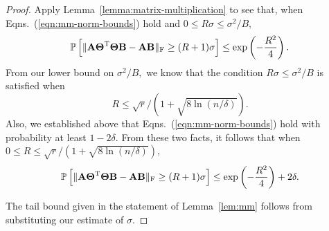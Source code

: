 \begin{proof}
Apply Lemma~\ref{lemma:matrix-multiplication} to see that, when Eqns.~(\ref{eqn:mm-norm-bounds}) hold and $0 \leq R \sigma \leq \sigma^2/B,$
\[
 \mbox{}{\mathbb{P}}\left[\mbox{}\|{\bm{\mathrm{A}}} {\bm{\mathrm{\Theta}}}^{\textsc{T}}{\bm{\mathrm{\Theta}}} {\bm{\mathrm{B}}} - {\bm{\mathrm{A}}} {\bm{\mathrm{B}}}\|_\mathrm{F} \geq (R + 1) \sigma \right]  \leq \mathrm{exp} \left( -{R^2\over 4} \right).
\]
From our lower bound on $\sigma^2/B,$ we know that the condition $R \sigma \leq \sigma^2/B$ is satisfied when
$$R \leq \sqrt{r}/(1 + \sqrt{8 \ln(n/\delta)}).$$ Also, we
established above that Eqns.~(\ref{eqn:mm-norm-bounds}) hold with probability at least $1 - 2\delta.$
From these two facts, it follows that when $0 \leq R \leq \sqrt{r}/(1 + \sqrt{8 \ln(n/\delta)}),$
\[
 \mbox{}{\mathbb{P}}\left[\mbox{}\|{\bm{\mathrm{A}}} {\bm{\mathrm{\Theta}}}^{\textsc{T}}{\bm{\mathrm{\Theta}}} {\bm{\mathrm{B}}} - {\bm{\mathrm{A}}} {\bm{\mathrm{B}}}\|_\mathrm{F} \geq (R + 1) \sigma \right]  \leq \mathrm{exp} \left( -{R^2\over 4} \right) + 2 \delta.
\]

The tail bound given in the statement of Lemma~\ref{lem:mm} follows from substituting our estimate of $\sigma.$
\end{proof}


